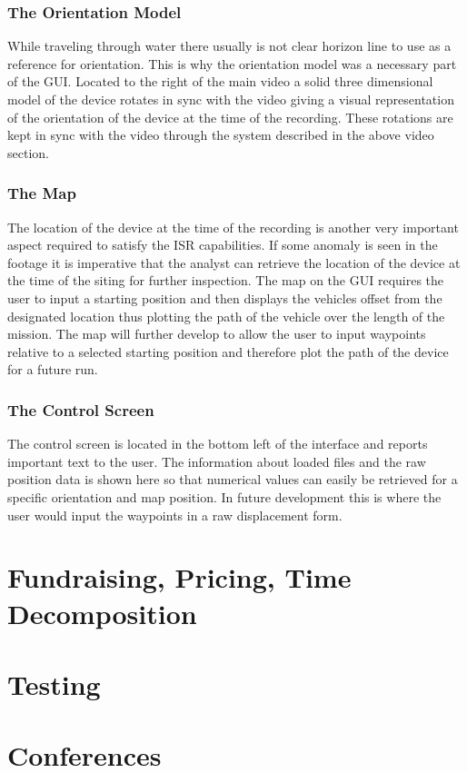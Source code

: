 \documentclass{report}
\begin{document}
\subsubsection{The Orientation Model}
While traveling through water there usually is not clear horizon line to use as a reference for orientation. This is why the orientation model was a necessary part of the GUI. Located to the right of the main video a solid three dimensional model of the device rotates in sync with the video giving a visual representation of the orientation of the device at the time of the recording. These rotations are kept in sync with the video through the system described in the above video section.
\subsubsection{The Map}
The location of the device at the time of the recording is another very important aspect required to satisfy the ISR capabilities. If some anomaly is seen in the footage it is imperative that the analyst can retrieve the location of the device at the time of the siting for further inspection. The map on the GUI requires the user to input a starting position and then displays the vehicles offset from the designated location thus plotting the path of the vehicle over the length of the mission. The map will further develop to allow the user to input waypoints relative to a selected starting position and therefore plot the path of the device for a future run.
\subsubsection{The Control Screen}
The control screen is located in the bottom left of the interface and reports important text to the user. The information about loaded files and the raw position data is shown here so that numerical values can easily be retrieved for a specific orientation and map position. In future development this is where the user would input the waypoints in a raw displacement form. 
\section{Fundraising, Pricing, Time Decomposition}
\section{Testing}
\section{Conferences}
\end{document}
